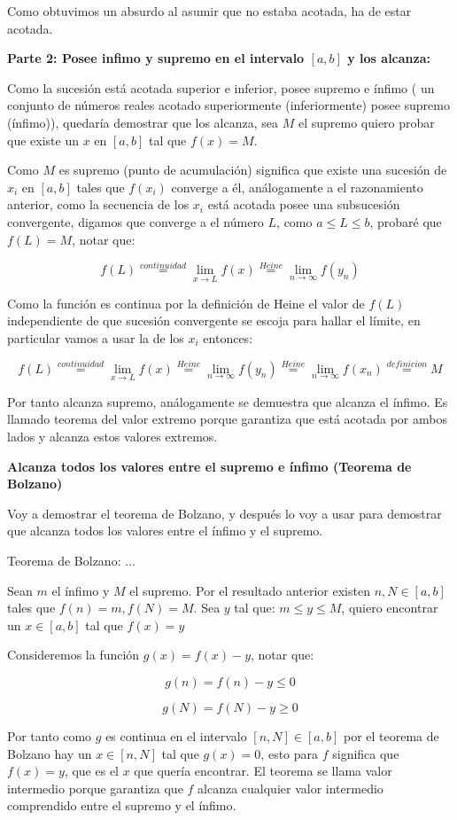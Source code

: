 \documentclass[14pt]{extarticle}
\begin{document}
Como obtuvimos un absurdo al asumir que no estaba acotada, ha de estar acotada.

\textbf{Parte 2: Posee infimo y supremo en el intervalo $[a,b]$ y los alcanza:}

Como la sucesión está acotada superior e inferior, posee supremo e ínfimo ( un conjunto de números reales acotado superiormente (inferiormente) posee supremo (ínfimo)), quedaría demostrar que los alcanza, sea $M$ el supremo quiero probar que existe un $x$ en $[a,b]$ tal que $f(x) = M$. 

Como $M$ es supremo (punto de acumulación) significa que existe una sucesión de $x_i$ en $[a,b]$ tales que $f(x_i)$ converge a él, análogamente a el razonamiento anterior, como la secuencia de los $x_i$ está acotada posee una subsucesión convergente, digamos que converge a el número $L$, como $a \leq L \leq b$, probaré que $f(L) = M$, notar que:

$$f(L) \stackrel{continuidad}{=}  \lim_{x \to L} f(x) \stackrel{Heine}{=}  \lim_{n \to \infty} f(y_n)$$

Como la función es continua por la definición de Heine el valor de $f(L)$ independiente de que sucesión convergente se escoja para hallar el límite, en particular vamos a usar la de los $x_i$ entonces:

$$f(L) \stackrel{continuidad}{=}  \lim_{x \to L} f(x) \stackrel{Heine}{=}  \lim_{n \to \infty} f(y_n) \stackrel{Heine}{=} \lim_{n \to \infty} f(x_n) \stackrel{definicion}{=} M $$

Por tanto alcanza supremo, análogamente se demuestra que alcanza el ínfimo. Es llamado teorema del valor extremo porque garantiza que está acotada por ambos lados y alcanza estos valores extremos.

\textbf{Alcanza todos los valores entre el supremo e ínfimo (Teorema de Bolzano)}

Voy a demostrar el teorema de Bolzano, y después lo voy a usar para demostrar que alcanza todos los valores entre el ínfimo y el supremo. 

Teorema de Bolzano: ...

Sean $m$ el ínfimo y $M$ el supremo. Por el resultado anterior existen $n,N \in [a,b]$ tales que $f(n) = m, f(N) = M$. Sea $y$ tal que:  $m \leq y \leq M$, quiero encontrar un $x \in [a,b]$ tal que $f(x) =y$ 

Consideremos la función $g(x) = f(x)- y$, notar que:

$$g(n) = f(n) - y \leq 0 $$

$$g(N) = f(N) - y \geq 0 $$

Por tanto como $g$ es continua en el intervalo $[n,N] \in [a,b]$ por el teorema de Bolzano hay un $x \in [n,N]$ tal que $g(x) = 0$, esto para $f$ significa que $f(x) = y$, que es el $x$ que quería encontrar. El teorema se llama valor intermedio porque garantiza que $f$ alcanza cualquier valor intermedio comprendido entre el supremo y el ínfimo.
\end{document}
